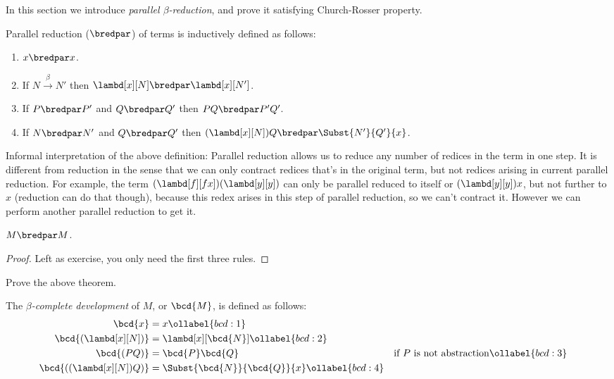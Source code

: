 \documentclass[../../../include/open-logic-section]{subfiles}
\begin{document}


In this section we introduce \emph{parallel $\beta$-reduction}, and
prove it satisfying Church-Rosser property.

\begin{defn} 
  Parallel reduction ($\bredpar$) of terms is inductively defined as follows:
  \begin{enumerate}
    \item {} $x \bredpar x$.
    \item {} If $N \xrightarrow{\beta} N'$ then $\lambd[x][N] \bredpar
      \lambd[x][N']$.
    \item {} If $P \bredpar P'$ and $Q \bredpar Q'$ then $PQ \bredpar
      P'Q'$.
    \item {} If $N \bredpar N'$ and $Q \bredpar Q'$ then
      $(\lambd[x][N])Q \bredpar \Subst{N'}{Q'}{x}$.
  \end{enumerate}
\end{defn}

Informal interpretation of the above definition: Parallel reduction allows us to reduce any number of redices in the
term in one step. It is different from reduction in the sense that we
can only contract redices that's in the original term, but not redices
arising in current parallel reduction. For example, the term
$(\lambd[f][fx])(\lambd[y][y])$ can only be parallel reduced
to itself or $(\lambd[y][y])x$, but not further to $x$ (reduction can do
that though), because this redex arises in this step of parallel reduction,
so we can't contract it. However we can perform another parallel
reduction      to get it.

\begin{thm}
  $M \bredpar M$.
\end{thm}
\begin{proof}
  Left as exercise, you only need the first three rules.
\end{proof}

\begin{prob}
  Prove the above theorem.
\end{prob}

\begin{defn}
  The \emph{$\beta$-complete development} of $M$, or $\bcd{M}$, is defined
  as follows:
  \begin{align}
    \bcd{x} &= x \ollabel{bcd:1} \\
    \bcd{(\lambd[x][N])} &= \lambd[x][\bcd{N}] \ollabel{bcd:2}\\
    \bcd{(PQ)} &= \bcd{P}\bcd{Q} && \text{if $P$ is not abstraction} \ollabel{bcd:3} \\
    \bcd{((\lambd[x][N])Q)} &= \Subst{\bcd{N}}{\bcd{Q}}{x} \ollabel{bcd:4}
  \end{align}
\end{defn}
\end{document}
